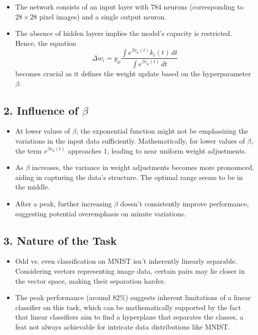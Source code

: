 \begin{itemize}
    \item The network consists of an input layer with $784$ neurons (corresponding to $28 \times 28$ pixel images) and a single output neuron.
    \item The absence of hidden layers implies the model's capacity is restricted. Hence, the equation 
    \[
    \Delta w_i = y_{\mu}\frac{\int e^{\beta v_{\mu}(t)} k_i(t) \, dt}{\int e^{\beta v_{\mu}(t)} \, dt}
    \]
    becomes crucial as it defines the weight update based on the hyperparameter $\beta$.
\end{itemize}

\subsection*{2. Influence of \( \beta \)}

\begin{itemize}
    \item At lower values of \( \beta \), the exponential function might not be emphasizing the variations in the input data sufficiently. Mathematically, for lower values of \( \beta \), the term $e^{\beta v_{\mu}(t)}$ approaches $1$, leading to near uniform weight adjustments.
    \item As \( \beta \) increases, the variance in weight adjustments becomes more pronounced, aiding in capturing the data's structure. The optimal range seems to be in the middle.
    \item After a peak, further increasing \( \beta \) doesn't consistently improve performance, suggesting potential overemphasis on minute variations.
\end{itemize}

\subsection*{3. Nature of the Task}

\begin{itemize}
    \item Odd vs. even classification on MNIST isn't inherently linearly separable. Considering vectors representing image data, certain pairs may lie closer in the vector space, making their separation harder.
    \item The peak performance (around 82\%) suggests inherent limitations of a linear classifier on this task, which can be mathematically supported by the fact that linear classifiers aim to find a hyperplane that separates the classes, a feat not always achievable for intricate data distributions like MNIST.
\end{itemize}

